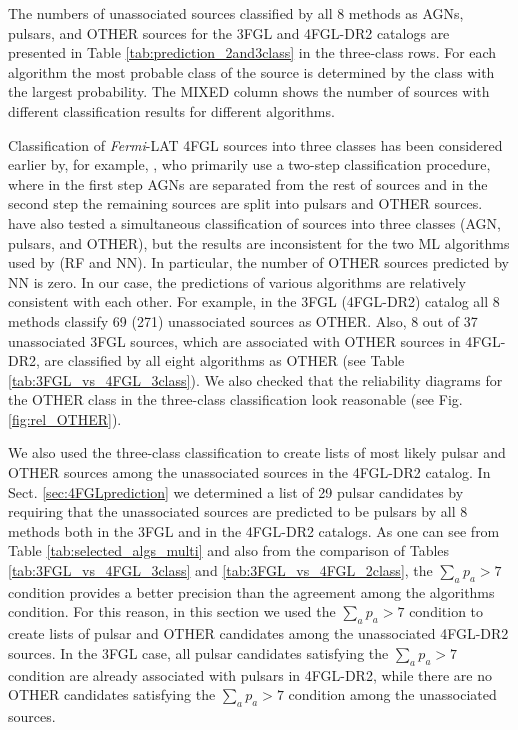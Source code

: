 \documentclass[referee]{aa} %
\newcommand{\Fermi}{\textit{Fermi}\xspace}
\begin{document}
The numbers of unassociated sources classified by all 8 methods as AGNs, pulsars, and OTHER sources for the 3FGL and 4FGL-DR2 catalogs are presented in Table \ref{tab:prediction_2and3class} in the three-class rows.
For each algorithm the most probable class of the source is determined by the class with the largest probability.
The MIXED column shows the number of sources with different classification results for different algorithms.

Classification of \Fermi-LAT 4FGL sources into three classes has been considered earlier by, for example, \cite{2021RAA....21...15Z}, 
who primarily use a two-step classification procedure, where in the first step AGNs are separated from the rest of sources and in the second step the remaining sources are split into pulsars and OTHER sources.
\cite{2021RAA....21...15Z} have also tested a simultaneous classification of sources into three classes (AGN, pulsars, and OTHER),
but the results are inconsistent for the two ML algorithms used by \cite{2021RAA....21...15Z} (RF and NN).
In particular, the number of OTHER sources predicted by NN is zero.
In our case, the predictions of various algorithms are relatively consistent with each other.
For example, in the 3FGL (4FGL-DR2) catalog all 8 methods classify 69 (271) unassociated sources as OTHER.
Also, 8 out of 37 unassociated 3FGL sources, which are associated with OTHER sources in 4FGL-DR2, are classified by all eight algorithms as
OTHER (see Table \ref{tab:3FGL_vs_4FGL_3class}).
We also checked that the reliability diagrams for the OTHER class in the three-class classification look reasonable
(see Fig. \ref{fig:rel_OTHER}).

We also used the three-class classification to create lists of most likely pulsar and OTHER sources among the unassociated
sources in the 4FGL-DR2 catalog.
In Sect. \ref{sec:4FGLprediction} we determined a list of 29 pulsar candidates by requiring that 
the unassociated sources are predicted to be pulsars by all 8 methods both in the 3FGL and in the 4FGL-DR2 catalogs.
As one can see from Table \ref{tab:selected_algs_multi} and also from the comparison of Tables \ref{tab:3FGL_vs_4FGL_3class}
and \ref{tab:3FGL_vs_4FGL_2class}, the $\sum_a p_a > 7$ condition provides a better precision than the 
agreement among the algorithms condition.
For this reason, in this section we used the $\sum_a p_a > 7$ condition to create lists of pulsar and OTHER candidates
among the unassociated 4FGL-DR2 sources.
In the 3FGL case, all pulsar candidates satisfying the $\sum_a p_a > 7$ condition are already associated with pulsars in 4FGL-DR2,
while there are no OTHER candidates satisfying the $\sum_a p_a > 7$ condition among the unassociated sources. 
\end{document}
